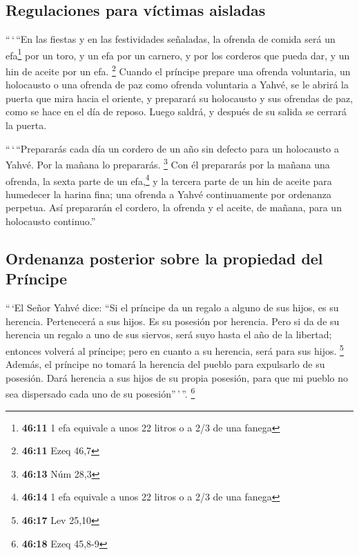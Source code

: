 \hypertarget{regulaciones-para-vuxedctimas-aisladas}{%
\subsection{Regulaciones para víctimas
aisladas}\label{regulaciones-para-vuxedctimas-aisladas}}

 ``\,`\,``En las fiestas y en las festividades señaladas,
la ofrenda de comida será un efa\footnote{\textbf{46:11} 1 efa equivale
  a unos 22 litros o a 2/3 de una fanega} por un toro, y un efa por un
carnero, y por los corderos que pueda dar, y un hin de aceite por un
efa. \footnote{\textbf{46:11} Ezeq 46,7}  Cuando el
príncipe prepare una ofrenda voluntaria, un holocausto o una ofrenda de
paz como ofrenda voluntaria a Yahvé, se le abrirá la puerta que mira
hacia el oriente, y preparará su holocausto y sus ofrendas de paz, como
se hace en el día de reposo. Luego saldrá, y después de su salida se
cerrará la puerta.

 ``\,`\,``Prepararás cada día un cordero de un año sin
defecto para un holocausto a Yahvé. Por la mañana lo prepararás.
\footnote{\textbf{46:13} Núm 28,3}  Con él prepararás por
la mañana una ofrenda, la sexta parte de un efa,\footnote{\textbf{46:14}
  1 efa equivale a unos 22 litros o a 2/3 de una fanega} y la tercera
parte de un hin de aceite para humedecer la harina fina; una ofrenda a
Yahvé continuamente por ordenanza perpetua.  Así
prepararán el cordero, la ofrenda y el aceite, de mañana, para un
holocausto continuo.''

\hypertarget{ordenanza-posterior-sobre-la-propiedad-del-pruxedncipe}{%
\subsection{Ordenanza posterior sobre la propiedad del
Príncipe}\label{ordenanza-posterior-sobre-la-propiedad-del-pruxedncipe}}

 ``\,`El Señor Yahvé dice: ``Si el príncipe da un regalo
a alguno de sus hijos, es su herencia. Pertenecerá a sus hijos. Es su
posesión por herencia.  Pero si da de su herencia un
regalo a uno de sus siervos, será suyo hasta el año de la libertad;
entonces volverá al príncipe; pero en cuanto a su herencia, será para
sus hijos. \footnote{\textbf{46:17} Lev 25,10}  Además,
el príncipe no tomará la herencia del pueblo para expulsarlo de su
posesión. Dará herencia a sus hijos de su propia posesión, para que mi
pueblo no sea dispersado cada uno de su posesión''\,'\,''. \footnote{\textbf{46:18}
  Ezeq 45,8-9}

